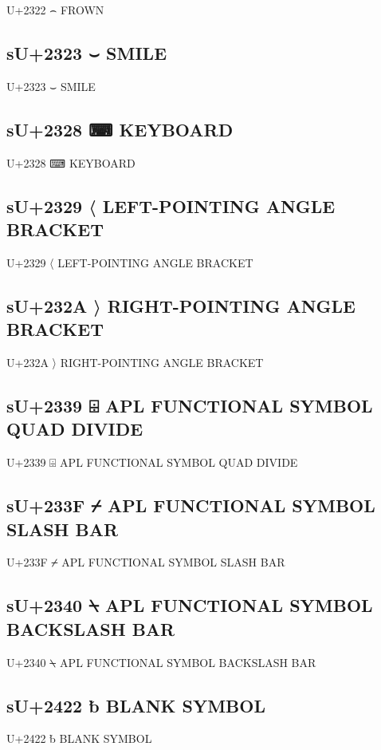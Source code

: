 U+2322 ⌢ FROWN

\subsection{sU+2323 ⌣ SMILE}

U+2323 ⌣ SMILE

\subsection{sU+2328 ⌨ KEYBOARD}

U+2328 ⌨ KEYBOARD

\subsection{sU+2329 〈 LEFT-POINTING ANGLE BRACKET}

U+2329 〈 LEFT-POINTING ANGLE BRACKET

\subsection{sU+232A 〉 RIGHT-POINTING ANGLE BRACKET}

U+232A 〉 RIGHT-POINTING ANGLE BRACKET

\subsection{sU+2339 ⌹ APL FUNCTIONAL SYMBOL QUAD DIVIDE}

U+2339 ⌹ APL FUNCTIONAL SYMBOL QUAD DIVIDE

\subsection{sU+233F ⌿ APL FUNCTIONAL SYMBOL SLASH BAR}

U+233F ⌿ APL FUNCTIONAL SYMBOL SLASH BAR

\subsection{sU+2340 ⍀ APL FUNCTIONAL SYMBOL BACKSLASH BAR}

U+2340 ⍀ APL FUNCTIONAL SYMBOL BACKSLASH BAR

\subsection{sU+2422 ␢  BLANK SYMBOL}

U+2422 ␢  BLANK SYMBOL

